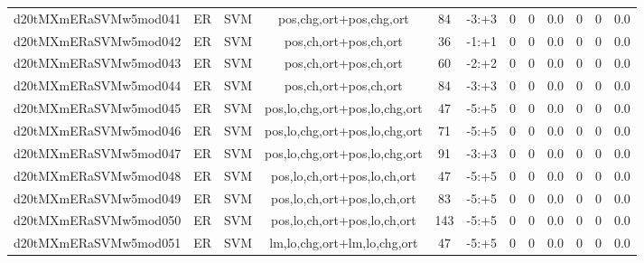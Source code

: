 \documentclass[a4paper]{article}
\begin{document}
\begin{landscape}
\begin{center}
\begin{tabular}{ |c|c|c|c|c|c|c|c|c|c|c|c|}
 
 	
 	\small{ d20tMXmERaSVMw5mod041 } & ER & SVM & pos,chg,ort+pos,chg,ort  &  84 &  -3:+3  &  0 & 0 & 0.0  &  0 & 0 & 0.0 \\
 	

 
 	
 	\small{ d20tMXmERaSVMw5mod042 } & ER & SVM & pos,ch,ort+pos,ch,ort  &  36 &  -1:+1  &  0 & 0 & 0.0  &  0 & 0 & 0.0 \\
 	

 
 	
 	\small{ d20tMXmERaSVMw5mod043 } & ER & SVM & pos,ch,ort+pos,ch,ort  &  60 &  -2:+2  &  0 & 0 & 0.0  &  0 & 0 & 0.0 \\
 	

 
 	
 	\small{ d20tMXmERaSVMw5mod044 } & ER & SVM & pos,ch,ort+pos,ch,ort  &  84 &  -3:+3  &  0 & 0 & 0.0  &  0 & 0 & 0.0 \\
 	

 
 	
 	\small{ d20tMXmERaSVMw5mod045 } & ER & SVM & pos,lo,chg,ort+pos,lo,chg,ort  &  47 &  -5:+5  &  0 & 0 & 0.0  &  0 & 0 & 0.0 \\
 	

 
 	
 	\small{ d20tMXmERaSVMw5mod046 } & ER & SVM & pos,lo,chg,ort+pos,lo,chg,ort  &  71 &  -5:+5  &  0 & 0 & 0.0  &  0 & 0 & 0.0 \\
 	

 
 	
 	\small{ d20tMXmERaSVMw5mod047 } & ER & SVM & pos,lo,chg,ort+pos,lo,chg,ort  &  91 &  -3:+3  &  0 & 0 & 0.0  &  0 & 0 & 0.0 \\
 	

 
 	
 	\small{ d20tMXmERaSVMw5mod048 } & ER & SVM & pos,lo,ch,ort+pos,lo,ch,ort  &  47 &  -5:+5  &  0 & 0 & 0.0  &  0 & 0 & 0.0 \\
 	

 
 	
 	\small{ d20tMXmERaSVMw5mod049 } & ER & SVM & pos,lo,ch,ort+pos,lo,ch,ort  &  83 &  -5:+5  &  0 & 0 & 0.0  &  0 & 0 & 0.0 \\
 	

 
 	
 	\small{ d20tMXmERaSVMw5mod050 } & ER & SVM & pos,lo,ch,ort+pos,lo,ch,ort  &  143 &  -5:+5  &  0 & 0 & 0.0  &  0 & 0 & 0.0 \\
 	

 
 	
 	\small{ d20tMXmERaSVMw5mod051 } & ER & SVM & lm,lo,chg,ort+lm,lo,chg,ort  &  47 &  -5:+5  &  0 & 0 & 0.0  &  0 & 0 & 0.0 \\
 	


\end{tabular}
\end{center}
\end{landscape}
\end{document}
